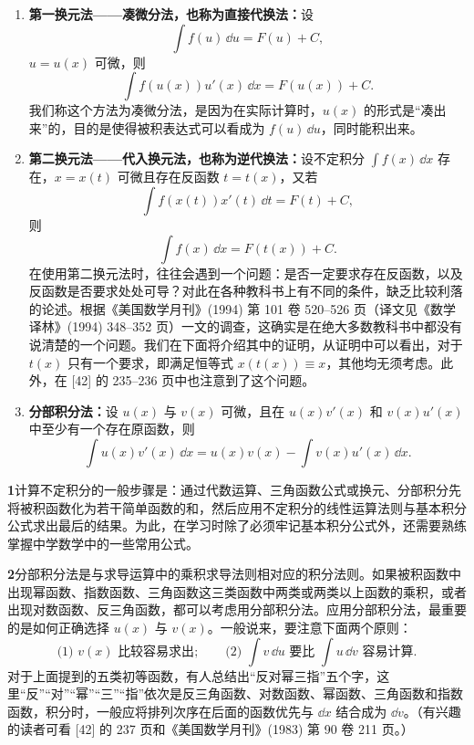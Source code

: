 \begin{enumerate}
  \item \textbf{第一换元法——凑微分法，也称为直接代换法：}设
  \[
    \int f(u)\,\dd u=F(u)+C,
  \]
  $u=u(x)$ 可微，则
  \[
    \int f(u(x))u'(x)\,\dd x=F(u(x))+C.
  \]
  我们称这个方法为凑微分法，是因为在实际计算时，$u(x)$ 的形式是“凑出来”的，目的是使得被积表达式可以看成为 $f(u)\,\dd u$，同时能积出来。

  \item \textbf{第二换元法——代入换元法，也称为逆代换法：}设不定积分 $\int f(x)\,\dd x$ 存在，$x=x(t)$ 可微且存在反函数 $t=t(x)$，又若
  \[
    \int f(x(t))x'(t)\,\dd t=F(t)+C,
  \]
  则
  \[
    \int f(x)\,\dd x=F(t(x))+C.
  \]
  在使用第二换元法时，往往会遇到一个问题：是否一定要求存在反函数，以及反函数是否要求处处可导？对此在各种教科书上有不同的条件，缺乏比较利落的论述。根据《美国数学月刊》(1994) 第 101 卷 520--526 页（译文见《数学译林》(1994) 348--352 页）一文的调查，这确实是在绝大多数教科书中都没有说清楚的一个问题。我们在下面将介绍其中的证明，从证明中可以看出，对于 $t(x)$ 只有一个要求，即满足恒等式 $x(t(x))\equiv x$，其他均无须考虑。此外，在 [42] 的 235--236 页中也注意到了这个问题。

  \item \textbf{分部积分法：}设 $u(x)$ 与 $v(x)$ 可微，且在 $u(x)v'(x)$ 和 $v(x)u'(x)$ 中至少有一个存在原函数，则
  \[
    \int u(x)v'(x)\,\dd x=u(x)v(x)-\int v(x)u'(x)\,\dd x.
  \]
\end{enumerate}

\begin{xremark}
\textbf{1}\quad 计算不定积分的一般步骤是：通过代数运算、三角函数公式或换元、分部积分先将被积函数化为若干简单函数的和，然后应用不定积分的线性运算法则与基本积分公式求出最后的结果。为此，在学习时除了必须牢记基本积分公式外，还需要熟练掌握中学数学中的一些常用公式。
\end{xremark}

\begin{xremark}
\textbf{2}\quad 分部积分法是与求导运算中的乘积求导法则相对应的积分法则。如果被积函数中出现幂函数、指数函数、三角函数这三类函数中两类或两类以上函数的乘积，或者出现对数函数、反三角函数，都可以考虑用分部积分法。应用分部积分法，最重要的是如何正确选择 $u(x)$ 与 $v(x)$。一般说来，要注意下面两个原则：
\[
  \text{(1) }v(x)\text{ 比较容易求出};
  \qquad
  \text{(2) }\int v\,\dd u\text{ 要比 }\int u\,\dd v\text{ 容易计算}.
\]
对于上面提到的五类初等函数，有人总结出“反对幂三指”五个字，这里“反”“对”“幂”“三”“指”依次是反三角函数、对数函数、幂函数、三角函数和指数函数，积分时，一般应将排列次序在后面的函数优先与 $\dd x$ 结合成为 $\dd v$。（有兴趣的读者可看 [42] 的 237 页和《美国数学月刊》(1983) 第 90 卷 211 页。）
\end{xremark}

